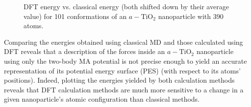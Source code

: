 \documentclass[aps,prb,twocolumn,amsmath,amssymb,superscriptaddress,longbibliography]{revtex4-1}
\newcommand\tab[1][1cm]{\hspace*{#1}} %
\begin{document}
\begin{figure}[htb]
\caption{DFT energy vs. classical energy (both shifted down by their average value) for 101 conformations of an $a-\text{TiO}_2$ nanoparticle with 390 atoms.}
\label{nnp_390}
\end{figure}

\tab Comparing the energies obtained using classical MD and those calculated using DFT reveals that a description of the forces inside an $a-\text{TiO}_2$ nanoparticle using only the two-body MA potential is not precise enough to yield an accurate representation of its potential energy surface (PES) (with respect to its atoms' positions).
Indeed, plotting the energies yielded by both calculation methods reveals that DFT calculation methods are much more sensitive to a change in a given nanoparticle's atomic configuration than classical methods.
\end{document}
